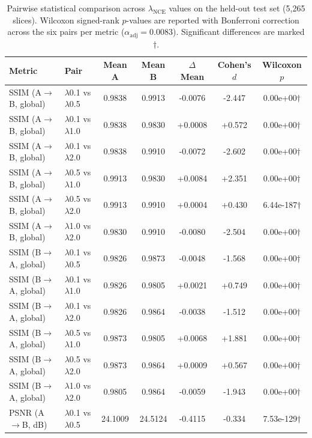 \begin{table}[t]
\centering
\caption{Pairwise statistical comparison across $\lambda_{\mathrm{NCE}}$ values on the held-out test set (5{,}265 slices). Wilcoxon signed-rank $p$-values are reported with Bonferroni correction across the six pairs per metric ($\alpha_{\mathrm{adj}}{=}0.0083$). Significant differences are marked $\dagger$.}
\label{tab:patchnce_pairwise_significance}
\begin{tabular}{l l c c c c c}
\toprule
Metric & Pair & Mean A & Mean B & $\Delta$ Mean & Cohen's $d$ & Wilcoxon $p$ \\
\midrule
SSIM (A$\to$B, global) & $\lambda$0.1 vs $\lambda$0.5 & 0.9838 & 0.9913 & -0.0076 & -2.447 & 0.00e+00$\dagger$ \\
SSIM (A$\to$B, global) & $\lambda$0.1 vs $\lambda$1.0 & 0.9838 & 0.9830 & +0.0008 & +0.572 & 0.00e+00$\dagger$ \\
SSIM (A$\to$B, global) & $\lambda$0.1 vs $\lambda$2.0 & 0.9838 & 0.9910 & -0.0072 & -2.602 & 0.00e+00$\dagger$ \\
SSIM (A$\to$B, global) & $\lambda$0.5 vs $\lambda$1.0 & 0.9913 & 0.9830 & +0.0084 & +2.351 & 0.00e+00$\dagger$ \\
SSIM (A$\to$B, global) & $\lambda$0.5 vs $\lambda$2.0 & 0.9913 & 0.9910 & +0.0004 & +0.430 & 6.44e-187$\dagger$ \\
SSIM (A$\to$B, global) & $\lambda$1.0 vs $\lambda$2.0 & 0.9830 & 0.9910 & -0.0080 & -2.504 & 0.00e+00$\dagger$ \\
\midrule
SSIM (B$\to$A, global) & $\lambda$0.1 vs $\lambda$0.5 & 0.9826 & 0.9873 & -0.0048 & -1.568 & 0.00e+00$\dagger$ \\
SSIM (B$\to$A, global) & $\lambda$0.1 vs $\lambda$1.0 & 0.9826 & 0.9805 & +0.0021 & +0.749 & 0.00e+00$\dagger$ \\
SSIM (B$\to$A, global) & $\lambda$0.1 vs $\lambda$2.0 & 0.9826 & 0.9864 & -0.0038 & -1.512 & 0.00e+00$\dagger$ \\
SSIM (B$\to$A, global) & $\lambda$0.5 vs $\lambda$1.0 & 0.9873 & 0.9805 & +0.0068 & +1.881 & 0.00e+00$\dagger$ \\
SSIM (B$\to$A, global) & $\lambda$0.5 vs $\lambda$2.0 & 0.9873 & 0.9864 & +0.0009 & +0.567 & 0.00e+00$\dagger$ \\
SSIM (B$\to$A, global) & $\lambda$1.0 vs $\lambda$2.0 & 0.9805 & 0.9864 & -0.0059 & -1.943 & 0.00e+00$\dagger$ \\
\midrule
PSNR (A$\to$B, dB) & $\lambda$0.1 vs $\lambda$0.5 & 24.1009 & 24.5124 & -0.4115 & -0.334 & 7.53e-129$\dagger$ \\

\end{tabular}
\end{table}
